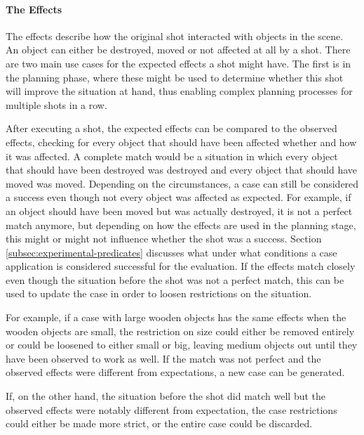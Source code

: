 

\paragraph{The Effects}
The effects describe how the original shot interacted with objects in the scene. An object can either be destroyed, moved or not affected at all by a shot. There are two main use cases for the expected effects a shot might have. The first is in the planning phase, where these might be used to determine whether this shot will improve the situation at hand, thus enabling complex planning processes for multiple shots in a row.

After executing a shot, the expected effects can be compared to the observed effects, checking for every object that should have been affected whether and how it was affected.
A complete match would be a situation in which every object that should have been destroyed was destroyed and every object that should have moved was moved. Depending on the circumstances, a case can still be considered a success even though not every object was affected as expected.
For example, if an object should have been moved but was actually destroyed, it is not a perfect match anymore, but depending on how the effects are used in the planning stage, this might or might not influence whether the shot was a success. Section \ref{subsec:experimental-predicates} discusses what under what conditions a case application is considered successful for the evaluation.
If the effects match closely even though the situation before the shot was not a perfect match, this can be used to update the case in order to loosen restrictions on the situation.

For example, if a case with large wooden objects has the same effects when the wooden objects are small, the restriction on size could either be removed entirely or could be loosened to either small or big, leaving medium objects out until they have been observed to work as well.
If the match was not perfect and the observed effects were different from expectations, a new case can be generated.

If, on the other hand, the situation before the shot did match well but the observed effects were notably different from expectation, the case restrictions could either be made more strict, or the entire case could be discarded.

